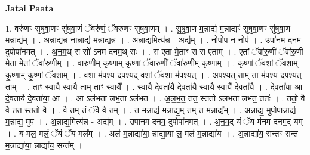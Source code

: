 \documentclass[17pt]{extarticle}
\begin{document}
\textbf{Jatai Paata} \newline

1. वरु॑णꣳ सुषुवा॒णꣳ सु॑षुवा॒णं ॅवरु॑णं॒ ॅवरु॑णꣳ सुषुवा॒णम् । . सु॒षु॒वा॒ण म॒न्नाद्य॑ म॒न्नाद्यꣳ॑ सुषुवा॒णꣳ सु॑षुवा॒ण म॒न्नाद्य᳚म् । . अ॒न्नाद्य॒न्न नान्नाद्य॑ म॒न्नाद्य॒न्न । . अ॒न्नाद्य॒मित्य॑न्न - अद्य᳚म् । . नोपोप॒ न नोप॑ । . उपा॑नम दनम॒ दुपोपा॑नमत् । . अ॒न॒म॒थ् स सो॑ ऽनम दनम॒थ् सः । . स ए॒ता मे॒ताꣳ स स ए॒ताम् । . ए॒तां ॅवा॑रु॒णीं ॅवा॑रु॒णी मे॒ता मे॒तां ॅवा॑रु॒णीम् । . वा॒रु॒णीम् कृ॒ष्णाम् कृ॒ष्णां ॅवा॑रु॒णीं ॅवा॑रु॒णीम् कृ॒ष्णाम् । . कृ॒ष्णां ॅव॒शां ॅव॒शाम् कृ॒ष्णाम् कृ॒ष्णां ॅव॒शाम् । . व॒शा म॑पश्य दपश्यद् व॒शां ॅव॒शा म॑पश्यत् । . अ॒प॒श्य॒त् ताम् ता म॑पश्य दपश्य॒त् ताम् । . ताꣳ स्वायै॒ स्वायै॒ ताम् ताꣳ स्वायै᳚ । . स्वायै॑ दे॒वता॑यै दे॒वता॑यै॒ स्वायै॒ स्वायै॑ दे॒वता॑यै । . दे॒वता॑या॒ आ दे॒वता॑यै दे॒वता॑या॒ आ । . आ ऽल॑भता लभ॒ता ऽल॑भत । . अ॒ल॒भ॒त॒ तत॒ स्ततो॑ ऽलभता लभत॒ ततः॑ । . ततो॒ वै वै तत॒ स्ततो॒ वै । . वै तम् तं ॅवै वै तम् । . त म॒न्नाद्य॑ म॒न्नाद्य॒म् तम् त म॒न्नाद्य᳚म् । . अ॒न्नाद्य॒ मुपोपा॒न्नाद्य॑ म॒न्नाद्य॒ मुप॑ । . अ॒न्नाद्य॒मित्य॑न्न - अद्य᳚म् । . उपा॑नम दनम॒ दुपोपा॑नमत् । . अ॒न॒म॒द् यं ॅय म॑नम दनम॒द् यम् । . य मल॒ मलं॒ ॅयं ॅय मल᳚म् । . अल॑ म॒न्नाद्या॑या॒ न्नाद्या॒या ल॒ मल॑ म॒न्नाद्या॑य । . अ॒न्नाद्या॑य॒ सन्तꣳ॒॒ सन्त॑ म॒न्नाद्या॑या॒ न्नाद्या॑य॒ सन्त᳚म् । \newline
\end{document}
